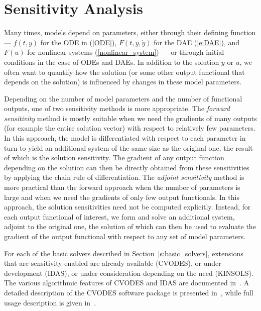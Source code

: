 \section{Sensitivity Analysis}\label{s:sensitivity_analysis}

Many times, models depend on parameters, either through their defining
function --- $f(t,y)$ for the ODE in (\ref{ODE}), $F(t,y,{\dot y})$ for the DAE
(\ref{e:DAE}), and $F(u)$ for nonlinear systems (\ref{nonlinear_system})
--- or through initial conditions in the case of ODEs and DAEs.
In addition to the solution $y$ or $u$, we often want to quantify how
the solution (or some other output functional that depends on the solution)
is influenced by changes in these model parameters.

Depending on the number of model parameters and the
number of functional outputs, one of two sensitivity methods
is more appropriate.
%
The {\em forward sensitivity} method is mostly suitable when we need
the gradients of many outputs (for example the entire solution vector)
with respect to relatively few parameters.
In this approach, the model is differentiated with respect to each
parameter in turn to yield an additional system of the same size as
the original one, the result of which is the solution sensitivity.
The gradient of any output function depending on the solution can
then be directly obtained from these sensitivities by applying the
chain rule of differentiation.
%
The {\em adjoint sensitivity} method is more practical than
the forward approach when the number of parameters is large and
when we need the gradients of only few output functionals.
In this approach, the solution sensitivities need not be computed
explicitly. Instead, for each output functional of interest, we form
and solve an additional system, adjoint to the original one, the
solution of which can then be used to evaluate the gradient of the
output functional with respect to any set of model parameters.

For each of the basic solvers described in Section~\ref{s:basic_solvers},
extensions that are sensitivity-enabled are already available (CVODES),
or under development (IDAS), or under consideration depending on
the need (KINSOLS).
The various algorithmic features of CVODES and IDAS are documented
in~\cite{CLPS:03}. A detailed description of the CVODES software package
is presented in~\cite{SeHi:03}, while full usage description is given
in~\cite{HiSe:04cvodes}.
%

